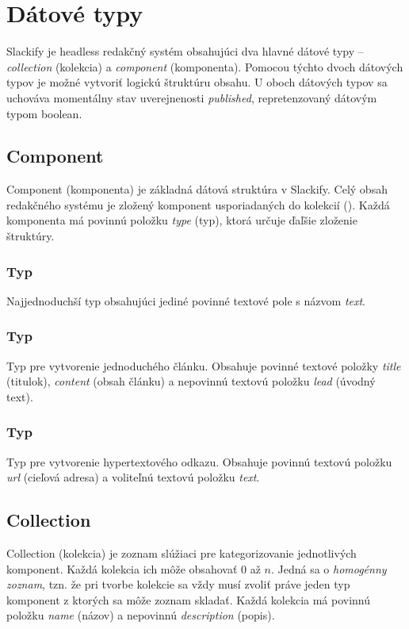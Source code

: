 \section{Dátové typy}
Slackify je headless redakčný systém obsahujúci dva hlavné dátové typy -- \emph{collection} (kolekcia) a \emph{component} (komponenta). Pomocou týchto dvoch dátových typov je možné vytvoriť logickú štruktúru obsahu. U oboch dátových typov sa uchováva momentálny stav uverejnenosti \emph{published}, repretenzovaný dátovým typom boolean.

\subsection{Component}
Component (komponenta) je základná dátová struktúra v Slackify. Celý obsah redakčného systému je zložený komponent usporiadaných do kolekcií (). Každá komponenta má povinnú položku \emph{type} (typ), ktorá určuje ďaľšie zloženie štruktúry.

\subsubsection{Typ }
Najjednoduchší typ obsahujúci jediné povinné textové pole s názvom \emph{text}.

\subsubsection{Typ }
Typ pre vytvorenie jednoduchého článku. Obsahuje povinné textové položky \emph{title} (titulok), \emph{content} (obsah článku) a nepovinnú textovú položku \emph{lead} (úvodný text).

\subsubsection{Typ }
Typ pre vytvorenie hypertextového odkazu. Obsahuje povinnú textovú položku \emph{url} (cieľová adresa) a voliteľnú textovú položku \emph{text}.

\subsection{Collection}
\label{subsection:collection}
Collection (kolekcia) je zoznam slúžiaci pre kategorizovanie jednotlivých komponent. Každá kolekcia ich môže obsahovať 0 až $n$. Jedná sa o \emph{homogénny zoznam}, tzn. že pri tvorbe kolekcie sa vždy musí zvoliť práve jeden typ komponent z ktorých sa môže zoznam skladať. Každá kolekcia má povinnú položku \emph{name} (názov) a nepovinnú \emph{description} (popis).

